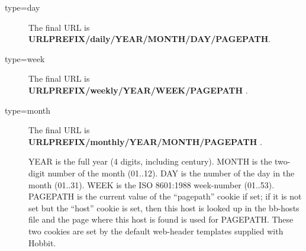  \begin{description}
\item[type=day] The final URL is \textbf{URLPREFIX/daily/YEAR/MONTH/DAY/PAGEPATH}. 

 

\item[type=week] The final URL is \textbf{URLPREFIX/weekly/YEAR/WEEK/PAGEPATH}
. 

 

\item[type=month] The final URL is \textbf{URLPREFIX/monthly/YEAR/MONTH/PAGEPATH}
. 

  YEAR is the full year (4 digits, including century). MONTH is the
  two-digit number of the month (01..12). DAY is the number of the day
  in the month (01..31). WEEK is the ISO 8601:1988 week-number
  (01..53). PAGEPATH is the current value of the ``pagepath'' cookie
  if set; if it is not set but the ``host'' cookie is set, then this
  host is looked up in the bb-hosts file and the page where this host
  is found is used for PAGEPATH. These two cookies are set by the
  default web-header templates supplied with Hobbit. 



\end{description}

